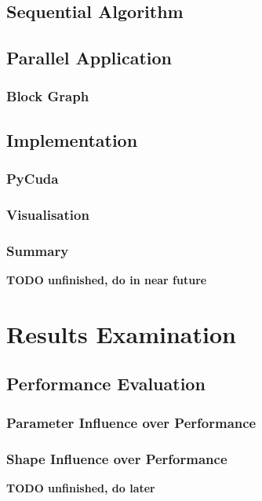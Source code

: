 \documentclass[12pt, oneside]{report}
\begin{document}
\section {Sequential Algorithm}



\section {Parallel Application}
\subsection{Block Graph}
\section {Implementation}
\subsection{PyCuda}
\subsection{Visualisation}
\subsection{Summary}

{\bf TODO unfinished, do in near future}


\chapter{Results Examination}
\section{Performance Evaluation}
\subsection{Parameter Influence over Performance}
\subsection{Shape Influence over Performance}
{\bf TODO unfinished, do later}


\newpage
\printbibliography
\end{document}
